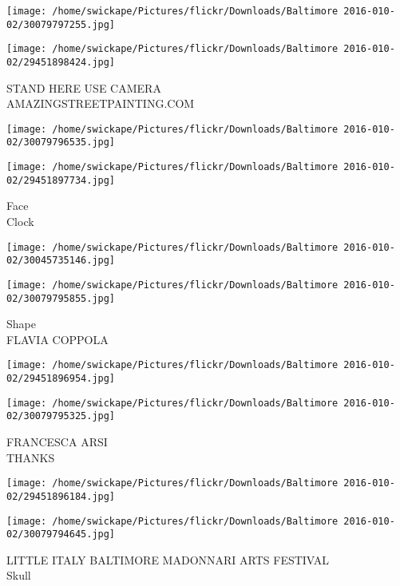 \documentclass[10pt,letterpaper]{article}
\begin{document}
\texttt{[image: /home/swickape/Pictures/flickr/Downloads/Baltimore 2016-010-02/30079797255.jpg]}

\vspace{0.25in}
\texttt{[image: /home/swickape/Pictures/flickr/Downloads/Baltimore 2016-010-02/29451898424.jpg]}

STAND HERE USE CAMERA\\
AMAZINGSTREETPAINTING.COM\\
\pagebreak

\texttt{[image: /home/swickape/Pictures/flickr/Downloads/Baltimore 2016-010-02/30079796535.jpg]}

\vspace{0.25in}
\texttt{[image: /home/swickape/Pictures/flickr/Downloads/Baltimore 2016-010-02/29451897734.jpg]}

Face\\
Clock\\
\pagebreak

\texttt{[image: /home/swickape/Pictures/flickr/Downloads/Baltimore 2016-010-02/30045735146.jpg]}

\vspace{0.25in}
\texttt{[image: /home/swickape/Pictures/flickr/Downloads/Baltimore 2016-010-02/30079795855.jpg]}

Shape\\
FLAVIA COPPOLA\\
\pagebreak

\texttt{[image: /home/swickape/Pictures/flickr/Downloads/Baltimore 2016-010-02/29451896954.jpg]}

\vspace{0.25in}
\texttt{[image: /home/swickape/Pictures/flickr/Downloads/Baltimore 2016-010-02/30079795325.jpg]}

FRANCESCA ARSI\\
THANKS\\
\pagebreak

\texttt{[image: /home/swickape/Pictures/flickr/Downloads/Baltimore 2016-010-02/29451896184.jpg]}

\vspace{0.25in}
\texttt{[image: /home/swickape/Pictures/flickr/Downloads/Baltimore 2016-010-02/30079794645.jpg]}

LITTLE ITALY BALTIMORE MADONNARI ARTS FESTIVAL\\
Skull\\
\pagebreak
\end{document}
